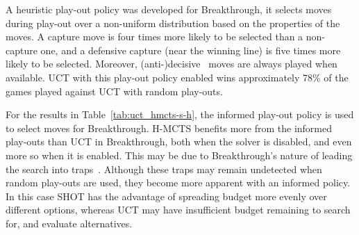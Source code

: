\documentclass{kecsmstr}
\begin{document}
\begin{table}[t]
\centering
\captionsetup{justification=centering,margin=1cm}
\tabcolsep=0.3cm
\vspace{3mm}
{\caption[H-MCTS vs. UCT, heuristic play-outs and solver.]{H-MCTS vs. UCT, heuristic play-outs, with/without solver.\\ Win percentages with respect to H-MCTS, 1,000 games} \label{tab:uct_hmcts-s-h}}
\end{table}

A heuristic play-out policy was developed for Breakthrough, it selects moves during play-out over a non-uniform distribution based on the properties of the moves. A capture move is four times more likely to be selected than a non-capture one, and a defensive capture (near the winning line) is five times more likely to be selected. Moreover, (anti-)decisive~ moves are always played when available. UCT with this play-out policy enabled wins approximately 78\% of the games played against UCT with random play-outs. 

For the results in Table~\ref{tab:uct_hmcts-s-h}, the informed play-out policy is used to select moves for Breakthrough. H-MCTS benefits more from the informed play-outs than UCT in Breakthrough, both when the solver is disabled, and even more so when it is enabled. This may be due to Breakthrough's nature of leading the search into traps~. Although these traps may remain undetected when random play-outs are used, they become more apparent with an informed policy. In this case SHOT has the advantage of spreading budget more evenly over different options, whereas UCT may have insufficient budget remaining to search for, and evaluate alternatives.
\end{document}
